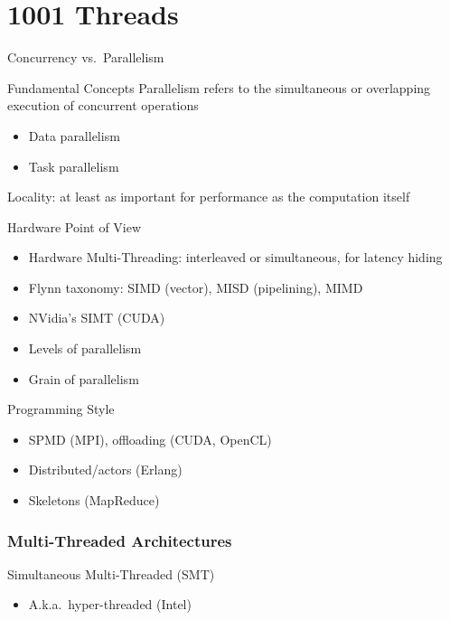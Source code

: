 \documentclass[xcolor=dvipsnames,9pt,mathserif]{beamer}
\newcommand{\pdftex}[2][1]{\scalebox{#1}{}}
\renewcommand{\emph}[1]{\alert{#1}}
\begin{document}
\section{1001 Threads}

\begin{frame}{Concurrency vs.\ Parallelism}
  \begin{block}{Fundamental Concepts}
    \emph{Parallelism} refers to the \emph{simultaneous} or
    \emph{overlapping} execution of concurrent operations

    \begin{itemize}
    \item Data parallelism
    \item Task parallelism
    \end{itemize}
  
    \emph{Locality}: at least as important for performance as the
    computation itself
  \end{block}
  
  \begin{block}{Hardware Point of View}
    \begin{itemize}
    \item Hardware Multi-Threading: interleaved or simultaneous, for
      latency hiding
    \item Flynn taxonomy: SIMD (vector), MISD (pipelining), MIMD
    \item NVidia's SIMT (CUDA)
    \item Levels of parallelism
    \item Grain of parallelism
    \end{itemize}
  \end{block}
  
  \begin{block}{Programming Style}
    \begin{itemize}
    \item SPMD (MPI), offloading (CUDA, OpenCL)
    \item Distributed/actors (Erlang)
    \item Skeletons (MapReduce)
    \end{itemize}
  \end{block}
\end{frame}

\begin{frame}
  \frametitle{Multi-Threaded Architectures}

  \begin{block}{Simultaneous Multi-Threaded (SMT)}
    \begin{itemize}
    \item A.k.a.\ hyper-threaded (Intel)
    \end{itemize}

    \centerline{\pdftex[.55]{threads_smt}}
  \end{block}
\end{frame}
\end{document}
